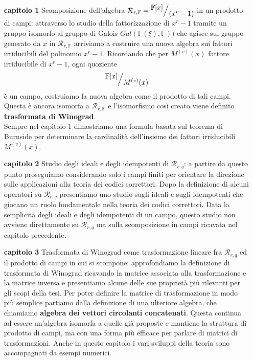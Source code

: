 \begin{enumerate}
   \item[{\bf capitolo 1}] Scomposizione dell'algebra $\mathcal{R}_{r,\mathbb{F}} = \quotient{ \mathbb{F}[x] }{ (x^r -1 )} $ in un prodotto di campi: attraverso lo studio della fattorizzazione di $x^r -1$ tramite un gruppo isomorfo al gruppo di Galois $Gal(\mathbb{F}(\xi), \mathbb{F}))$ che agisce sul gruppo generato da $x$ in $\mathcal{R}_{r,\mathbb{F}} $ arriviamo a costruire una nuova algebra sui fattori irriducibili del polinomio $x^r -1$. Ricordando che per $M^{(v)}(x)$ fattore irriducibile di $x^r -1$, ogni quoziente
   \begin{align*}
      \quotient{ \mathbb{F}[x] }{ M^{(v)}(x) }
   \end{align*}
   è un campo, costruiamo la nuova algebra come il prodotto di tali campi. Questa è ancora isomorfa a $\mathcal{R}_{r,\mathbb{F}}$ e l'isomorfismo così creato viene definito {\bf trasformata di Winograd}.\\
   Sempre nel capitolo 1 dimostriamo una formula basata sul teorema di Burnside per determinare la cardinalità dell'insieme dei fattori irriducibili $M^{(v)}(x)$.
   
   \item[{\bf capitolo 2}] Studio degli ideali e degli idempotenti di $\mathcal{R}_{r,q}$: a partire da questo punto proseguiamo considerando solo i campi finiti per orientare la direzione sulle applicazioni alla teoria dei codici correttori. Dopo la definizione di alcuni operatori su $\mathcal{R}_{r,q}$ presentiamo uno studio sugli ideali e sugli idempotenti che giocano un ruolo fondamentale nella teoria dei codici correttori. Data la semplicità degli ideali e degli idempotenti di un campo, questo studio non avviene direttamente su $\mathcal{R}_{r,q}$ ma sulla scomposizione in campi ricavata nel capitolo precedente.
   
   \item[{\bf capitolo 3}] Trasformata di Winograd come trasformazione lineare fra $\mathcal{R}_{r,q}$ ed il prodotto di campi in cui si scompone: approfondiamo la definizione di trasformata di Winograd ricavando la matrice associata alla trasformazione e la matrice inversa e presentiamo alcune delle sue proprietà più rilevanti per gli scopi della tesi. Per poter definire la matrice di trasformazione in modo più semplice partiamo dalla definizione di una ulteriore algebra, che chiamiamo {\bf algebra dei vettori circolanti concatenati}. Questa continua ad essere un'algebra isomorfa a quelle già proposte e mantiene la struttura di prodotto di campi, ma con una forma più efficace per parlare di matrici di trasformazioni. Anche in questo capitolo i vari sviluppi della teoria sono accompagnati da esempi numerici.
   

\end{enumerate}
